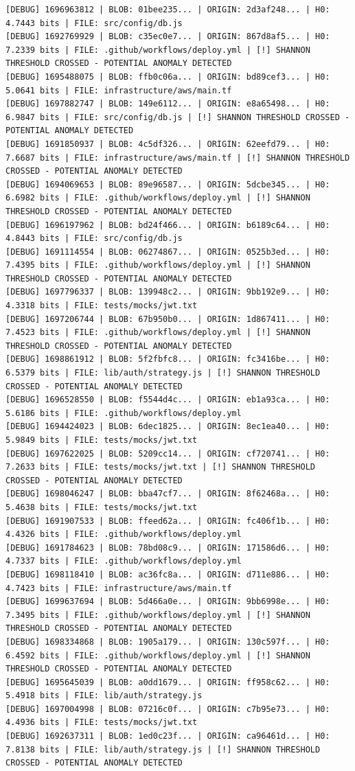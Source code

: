 \documentclass[12pt, a4paper, oneside]{report}
\begin{document}
\begin{lstlisting}[basicstyle=\tiny\ttfamily]
[DEBUG] 1696963812 | BLOB: 01bee235... | ORIGIN: 2d3af248... | H0: 4.7443 bits | FILE: src/config/db.js
[DEBUG] 1692769929 | BLOB: c35ec0e7... | ORIGIN: 867d8af5... | H0: 7.2339 bits | FILE: .github/workflows/deploy.yml | [!] SHANNON THRESHOLD CROSSED - POTENTIAL ANOMALY DETECTED
[DEBUG] 1695488075 | BLOB: ffb0c06a... | ORIGIN: bd89cef3... | H0: 5.0641 bits | FILE: infrastructure/aws/main.tf
[DEBUG] 1697882747 | BLOB: 149e6112... | ORIGIN: e8a65498... | H0: 6.9847 bits | FILE: src/config/db.js | [!] SHANNON THRESHOLD CROSSED - POTENTIAL ANOMALY DETECTED
[DEBUG] 1691850937 | BLOB: 4c5df326... | ORIGIN: 62eefd79... | H0: 7.6687 bits | FILE: infrastructure/aws/main.tf | [!] SHANNON THRESHOLD CROSSED - POTENTIAL ANOMALY DETECTED
[DEBUG] 1694069653 | BLOB: 89e96587... | ORIGIN: 5dcbe345... | H0: 6.6982 bits | FILE: .github/workflows/deploy.yml | [!] SHANNON THRESHOLD CROSSED - POTENTIAL ANOMALY DETECTED
[DEBUG] 1696197962 | BLOB: bd24f466... | ORIGIN: b6189c64... | H0: 4.8443 bits | FILE: src/config/db.js
[DEBUG] 1691114554 | BLOB: 06274867... | ORIGIN: 0525b3ed... | H0: 7.4395 bits | FILE: .github/workflows/deploy.yml | [!] SHANNON THRESHOLD CROSSED - POTENTIAL ANOMALY DETECTED
[DEBUG] 1697796337 | BLOB: 139948c2... | ORIGIN: 9bb192e9... | H0: 4.3318 bits | FILE: tests/mocks/jwt.txt
[DEBUG] 1697206744 | BLOB: 67b950b0... | ORIGIN: 1d867411... | H0: 7.4523 bits | FILE: .github/workflows/deploy.yml | [!] SHANNON THRESHOLD CROSSED - POTENTIAL ANOMALY DETECTED
[DEBUG] 1698861912 | BLOB: 5f2fbfc8... | ORIGIN: fc3416be... | H0: 6.5379 bits | FILE: lib/auth/strategy.js | [!] SHANNON THRESHOLD CROSSED - POTENTIAL ANOMALY DETECTED
[DEBUG] 1696528550 | BLOB: f5544d4c... | ORIGIN: eb1a93ca... | H0: 5.6186 bits | FILE: .github/workflows/deploy.yml
[DEBUG] 1694424023 | BLOB: 6dec1825... | ORIGIN: 8ec1ea40... | H0: 5.9849 bits | FILE: tests/mocks/jwt.txt
[DEBUG] 1697622025 | BLOB: 5209cc14... | ORIGIN: cf720741... | H0: 7.2633 bits | FILE: tests/mocks/jwt.txt | [!] SHANNON THRESHOLD CROSSED - POTENTIAL ANOMALY DETECTED
[DEBUG] 1698046247 | BLOB: bba47cf7... | ORIGIN: 8f62468a... | H0: 5.4638 bits | FILE: tests/mocks/jwt.txt
[DEBUG] 1691907533 | BLOB: ffeed62a... | ORIGIN: fc406f1b... | H0: 4.4326 bits | FILE: .github/workflows/deploy.yml
[DEBUG] 1691784623 | BLOB: 78bd08c9... | ORIGIN: 171586d6... | H0: 4.7337 bits | FILE: .github/workflows/deploy.yml
[DEBUG] 1698118410 | BLOB: ac36fc8a... | ORIGIN: d711e886... | H0: 4.7423 bits | FILE: infrastructure/aws/main.tf
[DEBUG] 1699637694 | BLOB: 5d466a0e... | ORIGIN: 9bb6998e... | H0: 7.3495 bits | FILE: .github/workflows/deploy.yml | [!] SHANNON THRESHOLD CROSSED - POTENTIAL ANOMALY DETECTED
[DEBUG] 1698334868 | BLOB: 1905a179... | ORIGIN: 130c597f... | H0: 6.4592 bits | FILE: .github/workflows/deploy.yml | [!] SHANNON THRESHOLD CROSSED - POTENTIAL ANOMALY DETECTED
[DEBUG] 1695645039 | BLOB: a0dd1679... | ORIGIN: ff958c62... | H0: 5.4918 bits | FILE: lib/auth/strategy.js
[DEBUG] 1697004998 | BLOB: 07216c0f... | ORIGIN: c7b95e73... | H0: 4.4936 bits | FILE: tests/mocks/jwt.txt
[DEBUG] 1692637311 | BLOB: 1ed0c23f... | ORIGIN: ca96461d... | H0: 7.8138 bits | FILE: lib/auth/strategy.js | [!] SHANNON THRESHOLD CROSSED - POTENTIAL ANOMALY DETECTED
\end{lstlisting}
\end{document}
